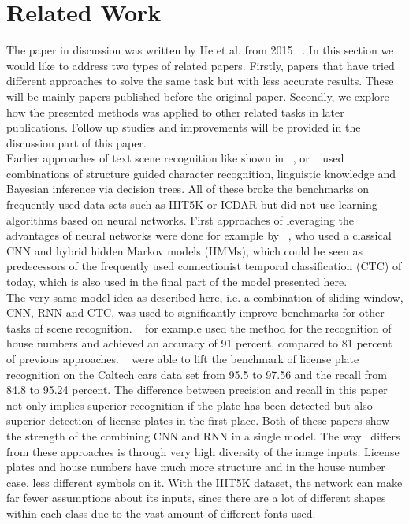 \documentclass{utue} %
\begin{document}
\section{Related Work}
The paper in discussion was written by He et al. from 2015 ~\cite{2015arXiv150604395H}. In this section we would like to address two types of related papers. Firstly, papers that have tried different approaches to solve the same task but with less accurate results. These will be mainly papers published before the original paper. Secondly, we explore how the presented methods was applied to other related tasks in later publications. Follow up studies and improvements will be provided in the discussion part of this paper. \\
Earlier approaches of text scene recognition like shown in ~\cite{iiit5k}, or ~\cite{6727574} used combinations of structure guided character recognition, linguistic knowledge and Bayesian inference via decision trees. All of these broke the benchmarks on frequently used data sets such as IIIT5K or ICDAR but did not use learning algorithms based on neural networks. First approaches of leveraging the advantages of neural networks were done for example by ~\cite{DBLP:journals/corr/AlsharifP13}, who used a classical CNN and hybrid hidden Markov models (HMMs), which could be seen as predecessors of the frequently used connectionist temporal classification (CTC) of today, which is also used in the final part of the model presented here.\\
The very same model idea as described here, i.e. a combination of sliding window, CNN, RNN and CTC, was used to significantly improve benchmarks for other tasks of scene recognition. ~\cite{DBLP:journals/corr/GuoTLL16} for example used the method for the recognition of house numbers and achieved an accuracy of 91 percent, compared to 81 percent of previous approaches. ~\cite{DBLP:journals/corr/LiS16} were able to lift the benchmark of license plate recognition on the Caltech cars data set from 95.5 to 97.56 and the recall from 84.8 to 95.24 percent. The difference between precision and recall in this paper not only implies superior recognition if the plate has been detected but also superior detection of license plates in the first place. Both of these papers show the strength of the combining CNN and RNN in a single model. The way~\cite{2015arXiv150604395H} differs from these approaches is through very high diversity of the image inputs: License plates and house numbers have much more structure and in the house number case, less different symbols on it. With the IIIT5K dataset, the network can make far fewer assumptions about its inputs, since there are a lot of different shapes within each class due to the vast amount of different fonts used.
\end{document}
